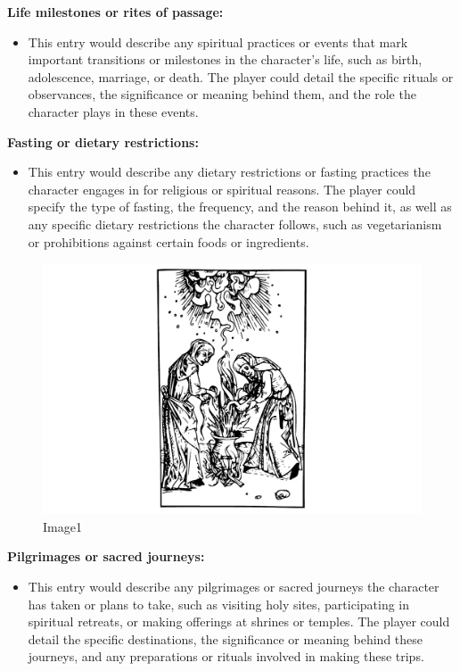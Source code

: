 \textbf{Life milestones or rites of passage:}

\begin{itemize}
\tightlist
\item
  This entry would describe any spiritual practices or events that mark
  important transitions or milestones in the character's life, such as
  birth, adolescence, marriage, or death. The player could detail the
  specific rituals or observances, the significance or meaning behind
  them, and the role the character plays in these events.
\end{itemize}

\textbf{Fasting or dietary restrictions:}

\begin{itemize}
\tightlist
\item
  This entry would describe any dietary restrictions or fasting
  practices the character engages in for religious or spiritual reasons.
  The player could specify the type of fasting, the frequency, and the
  reason behind it, as well as any specific dietary restrictions the
  character follows, such as vegetarianism or prohibitions against
  certain foods or ingredients.
\end{itemize}

\begin{figure}
\centering
\includegraphics{./images/religion07.pdf}
\caption{Image1}
\end{figure}

\textbf{Pilgrimages or sacred journeys:}

\begin{itemize}
\tightlist
\item
  This entry would describe any pilgrimages or sacred journeys the
  character has taken or plans to take, such as visiting holy sites,
  participating in spiritual retreats, or making offerings at shrines or
  temples. The player could detail the specific destinations, the
  significance or meaning behind these journeys, and any preparations or
  rituals involved in making these trips.
\end{itemize}

